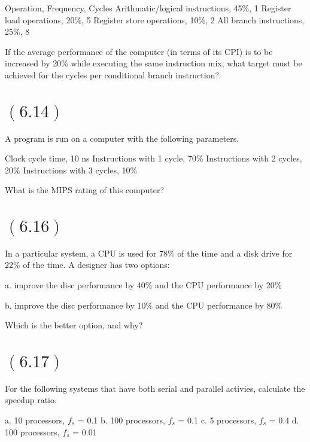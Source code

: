 \documentclass[letterpaper,12pt,titlepage]{article}
\begin{document}
Operation, Frequency, Cycles
Arithmatic/logical instructions, 45\%, 1
Register load operations, 20\%, 5
Register store operations, 10\%, 2
All branch instructions, 25\%, 8

If the average performance of the computer (in terms of its CPI) is to be increased by 20\% while executing the same instruction mix, what target must be achieved for the cycles per conditional branch instruction?

\begin{mdframed}[style=MyFrame]
\end{mdframed}

\section*{$(6.14)$} A program is run on a computer with the following parameters.

Clock cycle time, 10 ns
Instructions with 1 cycle, 70\%
Instructions with 2 cycles, 20\%
Instructions with 3 cycles, 10\%

What is the MIPS rating of this computer?

\begin{mdframed}[style=MyFrame]
\end{mdframed}

\section*{$(6.16)$} In a particular system, a CPU is used for 78\% of the time and a disk drive for 22\% of the time. A designer has two options:

a. improve the disc performance by 40\% and the CPU performance by 20\%

b. improve the disc performance by 10\% and the CPU performance by 80\%

Which is the better option, and why?

\begin{mdframed}[style=MyFrame]
\end{mdframed}

\section*{$(6.17)$} For the following systems that have both serial and parallel activies, calculate the speedup ratio.

a. 10 processors, $f_s$ = 0.1
b. 100 processors, $f_s$ = 0.1
c. 5 processors, $f_s$ = 0.4
d. 100 processors, $f_s$ = 0.01
\end{document}
